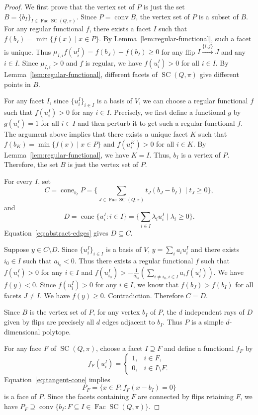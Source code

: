 \documentclass[11pt,a4paper]{article}
\theoremstyle{definition}
\theoremstyle{remark}
\newcommand{\SC}{\operatorname{SC}}
\newcommand{\cone}{\operatorname{cone}}
\newcommand{\conv}{\operatorname{conv}}
\newcommand{\Fac}{\operatorname{Fac}}
\numberwithin{equation}{section}
\begin{document}
\begin{proof}
We first prove that the vertex set of $P$ is just the set $B=\{b_I\}_{I\in \Fac\SC(Q,\pi)}$. Since $P=\conv B$, the vertex set of $P$ is a subset of $B$. For any regular functional $f$, there exists a facet $I$ such that $f(b_I)=\min\{f(x)\mid x\in P\}$. By Lemma~\ref{lem:regular-functional}, such a facet is unique. Thus $\mu_{I,i}f(u^I_i)=f(b_J)-f(b_I)\geq 0$ for any flip $I \overset{\{i,j\}}{\longrightarrow} J$ and any $i\in I$. Since $\mu_{I,i}>0$ and $f$ is regular, we have $f(u^I_i)>0$ for all $i\in I$. By Lemma~\ref{lem:regular-functional}, different facets of $\SC(Q,\pi)$ give different points in $B$.

For any facet $I$, since $\{u^I_i\}_{i\in I}$ is a basis of $V$, we can choose a regular functional $f$ such that $f(u^I_i)>0$ for any $i\in I$. Precisely, we first define a functional $g$ by $g(u^I_i)=1$ for all $i\in I$ and then perturb it to get such a regular functional $f$. The argument above implies that there exists a unique facet $K$ such that $f(b_K)=\min\{f(x)\mid x\in P\}$ and $f(u^K_i)>0$ for all $i\in K$. By Lemma~\ref{lem:regular-functional}, we have $K=I$. Thus, $b_I$ is a vertex of $P$. Therefore, the set $B$ is just the vertex set of $P$. 

For every $I$, set
\[
C=\cone_{b_I}P=\{\sum_{J\in \Fac\SC(Q,\pi)}t_J(b_J-b_I)\mid t_J\geq0\},
\]
and 
\[
D=\cone\{u_i^I:i\in I\}=\{\sum_{i\in I}\lambda_iu^I_i\mid \lambda_i\geq 0\}.
\]
Equation~\eqref{eq:abstract-edges} gives $D\subseteq C$.

Suppose $y\in C\setminus D$. Since $\{u^I_i\}_{i\in I}$ is a basis of $V$, $y=\sum_i a_iu_i^I$ and there exists $i_0\in I$ such that $a_{i_0}<0$. Thus there exists a regular functional $f$ such that $f(u_i^I)>0$ for any $i\in I$ and $f(u^I_{i_0})>-\frac{1}{a_{i_0}}(\sum_{i\neq i_0, i\in I}a_if(u^I_i))$. We have $f(y)<0$. Since $f(u_i^I)>0$ for any $i\in I$, we know that $f(b_J)>f(b_I)$ for all facets $J\neq I$. We have $f(y)\geq 0$. Contradiction. Therefore $C=D$.

Since $B$ is the vertex set of $P$, for any vertex $b_I$ of $P$, the $d$ independent rays of $D$ given by flips are precisely all $d$ edges adjacent to $b_I$. Thus $P$ is a simple $d$-dimensional polytope.

For any face $F$ of $\SC (Q,\pi)$, choose a facet $I\supseteq F$ and define a functional $f_F$ by
\[
f_F(u_i^I)=
\begin{cases}1,&i\in F,\\0,&i\in I\setminus F.\end{cases}
\]
Equation~\ref{eq:tangent-cone} implies 
\[
P_F=\{x\in P:f_F(x-b_I)=0\}
\]
is a face of $P$. Since the facets containing $F$
are connected by flips retaining $F$, we have $P_F\supseteq\conv\{b_I:F\subseteq I\in\Fac\SC (Q,\pi)\}$.


\end{proof}
\end{document}
